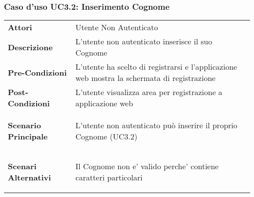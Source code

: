 \subsubsection{Caso d'uso UC3.2:  Inserimento Cognome}
\label{UC3_2}

\begin{longtable}{ l | p{11cm}}
	\hline
	\rowcolor{Gray}
	 \multicolumn{2}{c}{UC3.2 - Inserimento Cognome} \\
	 \hline
	\textbf{Attori} & Utente Non Autenticato \\
	\textbf{Descrizione} & L'utente non autenticato inserisce il suo Cognome  \\
	\textbf{Pre-Condizioni} & L'utente ha scelto di registrarsi e l'applicazione web mostra la schermata di registrazione \\
	\textbf{Post-Condizioni} & L'utente visualizza area per registrazione a applicazione web \\
	\textbf{Scenario Principale} & \begin{enumerate*}[label=(\arabic*.),itemjoin={\newline}]
		\item L'utente non autenticato può inserire il proprio Cognome (UC3.2)
	\end{enumerate*}\\
	\textbf{Scenari Alternativi} & 
	\begin{enumerate*}[label=(\arabic*.),itemjoin={\newline}]
		\item Il Cognome non e' valido perche' contiene caratteri particolari
	\end{enumerate*}\\
\end{longtable}